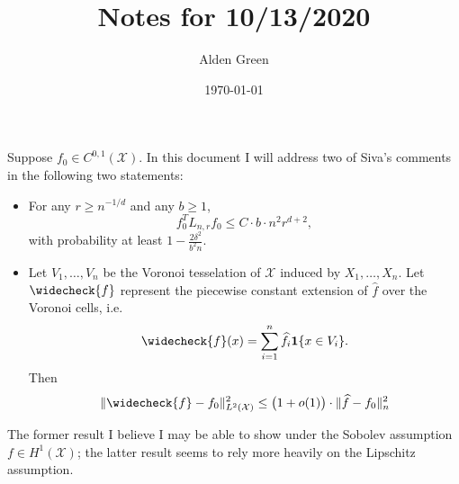 \documentclass{article}
\newcommand{\1}{\mathbf{1}}
\newcommand{\Lap}{L}
\newcommand{\Xset}{\mathcal{X}}
\newcommand{\Leb}{L}
\newcommand{\wh}[1]{\widehat{#1}}
\theoremstyle{definition}
\theoremstyle{remark}
\begin{document}
\title{Notes for 10/13/2020}
\author{Alden Green}
\date{\today}
\maketitle

Suppose $f_0 \in C^{0,1}(\Xset)$. In this document I will address two of Siva's comments in the following two statements:
\begin{itemize}
	\item For any $r \geq n^{-1/d}$ and any $b \geq 1$, 
	\begin{equation}
	\label{eqn:siva1}
	f_0^T \Lap_{n,r} f_0 \leq C \cdot b \cdot n^2 r^{d + 2},
	\end{equation}
	with probability at least $1 - \frac{2\delta^2}{b^2n}$.
	\item Let $V_1,\ldots,V_n$ be the Voronoi tesselation of $\Xset$ induced by $X_1,\ldots,X_n$. Let $\widecheck{f}$ represent the piecewise constant extension of $\wh{f}$ over the Voronoi cells, i.e.
	\begin{equation}
	\label{eqn:extension_voronoi}
	\widecheck{f}(x) = \sum_{i = 1}^{n} \wh{f}_{i} \1\{x \in V_i\}.
	\end{equation}
	Then 
	\begin{equation}
	\label{eqn:L2P_error}
	\|\widecheck{f} - f_0\|_{\Leb^2(\Xset)}^2 \leq \bigl(1 + o(1)\bigr) \cdot \|\wh{f} - f_0\|_n^2
	\end{equation}
\end{itemize}
The former result I believe I may be able to show under the Sobolev assumption $f \in H^1(\Xset)$; the latter result seems to rely more heavily on the Lipschitz assumption.
\end{document}
